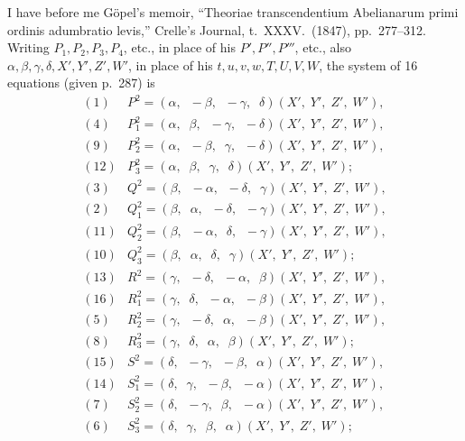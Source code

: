 \documentclass[11pt,a4paper]{article}
\begin{document}
\noindent I have before me G\"opel's memoir, ``Theoriae transcendentium Abelianarum primi ordinis adumbratio levis,'' Crelle's Journal, t.~XXXV.\ (1847), pp.~277--312. Writing $P_{1}, P_{2}, P_{3}, P_{4}$, etc., in place of his $P', P'', P'''$, etc., also $\alpha, \beta, \gamma, \delta, X', Y', Z', W'$, in place of his $t, u, v, w, T, U, V, W$, the system of 16 equations (given p.~287) is
\[
\begin{array}{rl}
(1) & P^{2} = (\alpha,\;\; -\beta,\;\; -\gamma,\;\; \delta)(X',\;Y',\;Z',\;W'),\\
(4) & P_{1}^{2} = (\alpha,\;\; \beta,\;\; -\gamma,\;\; -\delta)(X',\;Y',\;Z',\;W'),\\
(9) & P_{2}^{2} = (\alpha,\;\; -\beta,\;\; \gamma,\;\; -\delta)(X',\;Y',\;Z',\;W'),\\
(12) & P_{3}^{2} = (\alpha,\;\; \beta,\;\; \gamma,\;\; \delta)(X',\;Y',\;Z',\;W');\\[4pt]
(3) & Q^{2} = (\beta,\;\; -\alpha,\;\; -\delta,\;\; \gamma)(X',\;Y',\;Z',\;W'),\\
(2) & Q_{1}^{2} = (\beta,\;\; \alpha,\;\; -\delta,\;\; -\gamma)(X',\;Y',\;Z',\;W'),\\
(11) & Q_{2}^{2} = (\beta,\;\; -\alpha,\;\; \delta,\;\; -\gamma)(X',\;Y',\;Z',\;W'),\\
(10) & Q_{3}^{2} = (\beta,\;\; \alpha,\;\; \delta,\;\; \gamma)(X',\;Y',\;Z',\;W');\\[4pt]
(13) & R^{2} = (\gamma,\;\; -\delta,\;\; -\alpha,\;\; \beta)(X',\;Y',\;Z',\;W'),\\
(16) & R_{1}^{2} = (\gamma,\;\; \delta,\;\; -\alpha,\;\; -\beta)(X',\;Y',\;Z',\;W'),\\
(5) & R_{2}^{2} = (\gamma,\;\; -\delta,\;\; \alpha,\;\; -\beta)(X',\;Y',\;Z',\;W'),\\
(8) & R_{3}^{2} = (\gamma,\;\; \delta,\;\; \alpha,\;\; \beta)(X',\;Y',\;Z',\;W');\\[4pt]
(15) & S^{2} = (\delta,\;\; -\gamma,\;\; -\beta,\;\; \alpha)(X',\;Y',\;Z',\;W'),\\
(14) & S_{1}^{2} = (\delta,\;\; \gamma,\;\; -\beta,\;\; -\alpha)(X',\;Y',\;Z',\;W'),\\
(7) & S_{2}^{2} = (\delta,\;\; -\gamma,\;\; \beta,\;\; -\alpha)(X',\;Y',\;Z',\;W'),\\
(6) & S_{3}^{2} = (\delta,\;\; \gamma,\;\; \beta,\;\; \alpha)(X',\;Y',\;Z',\;W');
\end{array}
\]

\newpage

\end{document}
